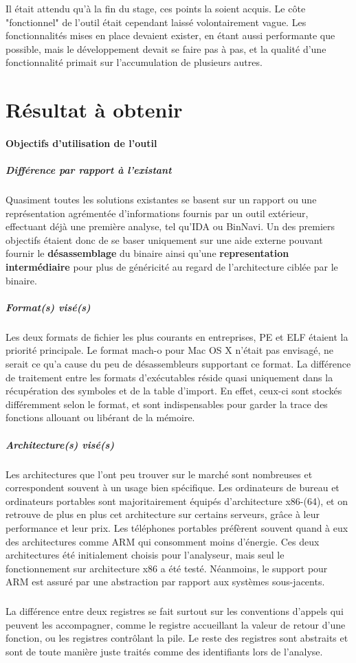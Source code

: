 Il était attendu qu'à la fin du stage, ces points la soient acquis. Le côte "fonctionnel"
de l'outil était cependant laissé volontairement vague. Les fonctionnalités mises en place
devaient exister, en étant aussi performante que possible, mais le développement devait se faire
pas à pas, et la qualité d'une fonctionnalité primait sur l'accumulation de plusieurs autres.

\section{Résultat à obtenir}
\paragraph{Objectifs d'utilisation de l'outil}

\subparagraph{Différence par rapport à l'existant}

Quasiment toutes les solutions existantes se basent sur un rapport ou une représentation agrémentée d'informations fournis
par un outil extérieur, effectuant déjà une première analyse, tel qu'IDA ou BinNavi. Un des premiers objectifs étaient donc de
se baser uniquement sur une aide externe pouvant fournir le \textbf{désassemblage} du binaire ainsi qu'une \textbf{representation intermédiaire}
pour plus de généricité au regard de l'architecture ciblée par le binaire.

\subparagraph{Format(s) visé(s)}

Les deux formats de fichier les plus courants en entreprises, PE et ELF étaient la priorité principale. Le format mach-o pour
Mac OS X n'était pas envisagé, ne serait ce qu'a cause du peu de désassembleurs supportant ce format. La différence de traitement
entre les formats d'exécutables réside quasi uniquement dans la récupération des symboles et de la table d'import. En effet, ceux-ci
sont stockés différemment selon le format, et sont indispensables pour garder la trace des fonctions allouant ou libérant de la mémoire.

\subparagraph{Architecture(s) visé(s)}
Les architectures que l'ont peu trouver sur le marché sont nombreuses et correspondent souvent à un usage bien spécifique.
Les ordinateurs de bureau et ordinateurs portables sont majoritairement équipés d'architecture x86-(64), et on retrouve de plus en plus
cet architecture sur certains serveurs, grâce à leur performance et leur prix. Les téléphones portables préfèrent souvent quand à eux
des architectures comme ARM qui consomment moins d'énergie. Ces deux architectures été initialement choisis pour l'analyseur, mais seul
le fonctionnement sur architecture x86 a été testé. Néanmoins, le support pour ARM est assuré par une abstraction par rapport aux systèmes
sous-jacents.
\subparagraph{}
La différence entre deux registres se fait surtout sur les conventions d'appels qui peuvent les accompagner, comme le registre accueillant
la valeur de retour d'une fonction, ou les registres contrôlant la pile. Le reste des registres sont abstraits et sont de toute manière
juste traités comme des identifiants lors de l'analyse.




